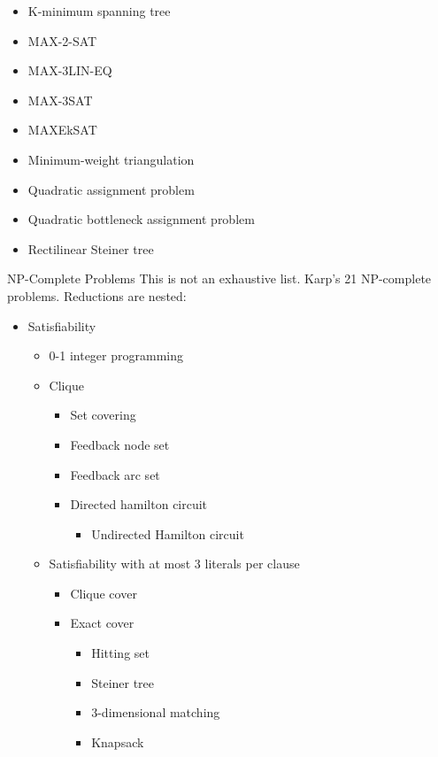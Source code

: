 \documentclass[2pt,legalpaper]{scrartcl}
\makeatletter
\renewcommand{\section}{\@startsection{section}{1}{0mm}
  {-1ex plus -.5ex minus -.2ex}
  {0.5ex plus .2ex}
{\normalfont\large\bfseries}}
\makeatother
\begin{document}
\begin{multicols}{6}
  \begin{itemize}
      \item K-minimum spanning tree
      \item MAX-2-SAT
      \item MAX-3LIN-EQ
      \item MAX-3SAT
      \item MAXEkSAT
      \item Minimum-weight triangulation
      \item Quadratic assignment problem
      \item Quadratic bottleneck assignment problem
      \item Rectilinear Steiner tree
  \end{itemize}
  
  \section{NP-Complete Problems}
  This is not an exhaustive list. Karp's 21 NP-complete problems. Reductions are nested:
  \begin{itemize}
      \item Satisfiability
          \begin{itemize}
              \item 0-1 integer programming
              \item Clique
              \begin{itemize}
                  \item Set covering
                  \item Feedback node set
                  \item Feedback arc set
                  \item Directed hamilton circuit
                  \begin{itemize}
                      \item Undirected Hamilton circuit
                  \end{itemize}
              \end{itemize}
              \item Satisfiability with at most 3 literals per clause
              \begin{itemize}
                  \item Clique cover
                  \item Exact cover
                  \begin{itemize}
                      \item Hitting set
                      \item Steiner tree
                      \item 3-dimensional matching
                      \item Knapsack
                  \end{itemize}
              \end{itemize}
          \end{itemize}
      

\end{itemize}
\end{multicols}
\end{document}
